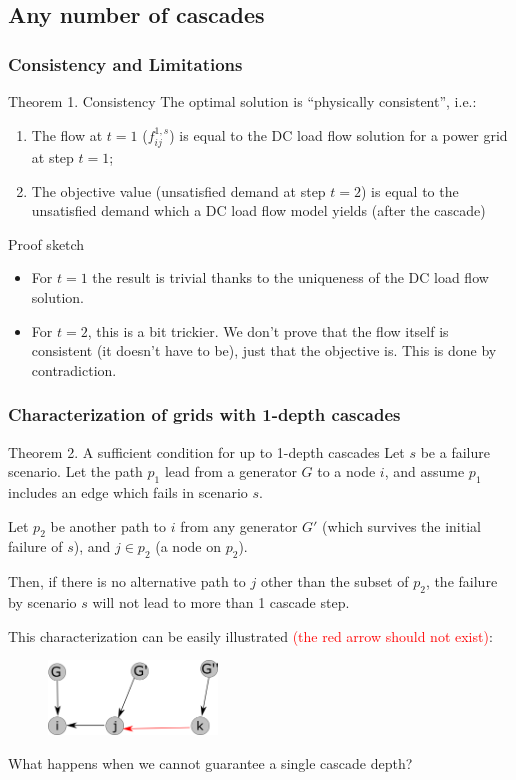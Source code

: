\documentclass{beamer}
\begin{document}
\subsection{Any number of cascades}
\begin{frame}
\frametitle{Consistency and Limitations}
\begin{block}{Theorem 1. Consistency}
The optimal solution is ``physically consistent'', i.e.:
\begin{enumerate}
\item The flow at $t=1$ ($f_{ij}^{1,s}$) is equal to the DC load flow solution for a power grid at step $t=1$;
\item The objective value (unsatisfied demand at step $t=2$) is equal to the unsatisfied demand which a DC load flow model yields (after the cascade)
\end{enumerate}
\end{block}\pause\small
Proof sketch
\begin{itemize}
	\item For $t=1$ the result is trivial thanks to the uniqueness of the DC load flow solution.
	\item For $t=2$, this is a bit trickier. We don't prove that the flow itself is consistent (it doesn't have to be), just that the objective is. This is done by contradiction.
\end{itemize}
\end{frame}

\begin{frame}
\frametitle{Characterization of grids with 1-depth cascades}
\begin{block}{Theorem 2. A sufficient condition for up to 1-depth cascades}
Let $s$ be a failure scenario. Let the path $p_1$ lead from a generator $G$ to a node $i$, and assume $p_1$ includes an edge which fails in scenario $s$. 

Let $p_2$ be another path to $i$ from any generator $G'$ (which survives the initial failure of $s$), and $j\in p_2$ (a node on $p_2$). 

Then, if there is no alternative path to $j$ other than the subset of $p_2$, the failure by scenario $s$ will not lead to more than 1 cascade step.\pause
\end{block}
This characterization can be easily illustrated \textcolor{red}{(the red arrow should not exist)}:
\begin{figure}%
\centering
\includegraphics[width=0.4\textwidth]{Aux_files/characterization.png}
\end{figure}
What happens when we cannot guarantee a single cascade depth?
\end{frame}
\end{document}
